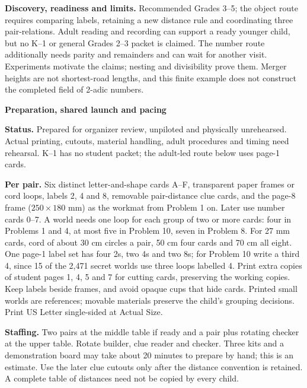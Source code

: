 \documentclass[11pt]{article}
\newcommand{\head}[1]{\par\textbf{\large #1}\par}
\begin{document}
\textbf{Discovery, readiness and limits.} Recommended Grades 3--5; the object route requires comparing labels, retaining a new distance rule and coordinating three pair-relations. Adult reading and recording can support a ready younger child, but no K--1 or general Grades 2--3 packet is claimed. The number route additionally needs parity and remainders and can wait for another visit. Experiments motivate the claims; nesting and divisibility prove them. Merger heights are not shortest-road lengths, and this finite example does not construct the completed field of 2-adic numbers.
\newpage
\head{Preparation, shared launch and pacing}
\textbf{Status.} Prepared for organizer review, unpiloted and physically unrehearsed. Actual printing, cutouts, material handling, adult procedures and timing need rehearsal. K--1 has no student packet; the adult-led route below uses page-1 cards.

\textbf{Per pair.} Six distinct letter-and-shape cards A--F, transparent paper frames or cord loops, labels 2, 4 and 8, removable pair-distance clue cards, and the page-8 frame ($250\times180$ mm) as the workmat from Problem 1 on. Later use number cards 0--7. A world needs one loop for each group of two or more cards: four in Problems 1 and 4, at most five in Problem 10, seven in Problem 8. For 27 mm cards, cord of about 30 cm circles a pair, 50 cm four cards and 70 cm all eight. One page-1 label set has four 2s, two 4s and two 8s; for Problem 10 write a third 4, since 15 of the 2,471 secret worlds use three loops labelled 4. Print extra copies of student pages 1, 4, 5 and 7 for cutting cards, preserving the working copies. Keep labels beside frames, and avoid opaque cups that hide cards. Printed small worlds are references; movable materials preserve the child's grouping decisions. Print US Letter single-sided at Actual Size.

\textbf{Staffing.} Two pairs at the middle table if ready and a pair plus rotating checker at the upper table. Rotate builder, clue reader and checker. Three kits and a demonstration board may take about 20 minutes to prepare by hand; this is an estimate. Use the later clue cutouts only after the distance convention is retained. A complete table of distances need not be copied by every child.
\end{document}
